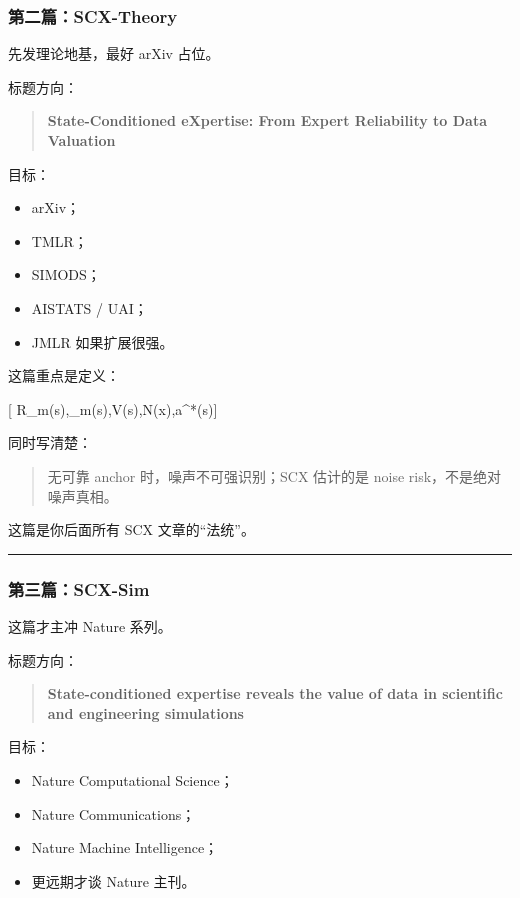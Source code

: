 \documentclass[
  12pt,
]{ctexart}
\providecommand{\tightlist}{%
  \setlength{\itemsep}{0pt}\setlength{\parskip}{0pt}}
\begin{document}
\subsubsection{第二篇：SCX-Theory}\label{ux7b2cux4e8cux7bc7scx-theory}

先发理论地基，最好 arXiv 占位。

标题方向：

\begin{quote}
\textbf{State-Conditioned eXpertise: From Expert Reliability to Data
Valuation}
\end{quote}

目标：

\begin{itemize}
\tightlist
\item
  arXiv；
\item
  TMLR；
\item
  SIMODS；
\item
  AISTATS / UAI；
\item
  JMLR 如果扩展很强。
\end{itemize}

这篇重点是定义：

{[}
R\_m(s),\quad {}\_m(s),\quad V(s),\quad N(x),\quad a\^{}*(s){]}

同时写清楚：

\begin{quote}
无可靠 anchor 时，噪声不可强识别；SCX 估计的是 noise
risk，不是绝对噪声真相。
\end{quote}

这篇是你后面所有 SCX 文章的``法统''。

\begin{center}\rule{0.5\linewidth}{0.5pt}\end{center}

\subsubsection{第三篇：SCX-Sim}\label{ux7b2cux4e09ux7bc7scx-sim}

这篇才主冲 Nature 系列。

标题方向：

\begin{quote}
\textbf{State-conditioned expertise reveals the value of data in
scientific and engineering simulations}
\end{quote}

目标：

\begin{itemize}
\tightlist
\item
  Nature Computational Science；
\item
  Nature Communications；
\item
  Nature Machine Intelligence；
\item
  更远期才谈 Nature 主刊。
\end{itemize}
\end{document}

